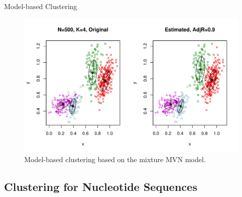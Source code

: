 \documentclass{beamer}
\begin{document}
\begin{frame}{Model-based Clustering}
\vspace{-0.5cm}

\begin{figure}
  \includegraphics[width=\textwidth]{./graph/da4}
  \\
  {\tiny Model-based clustering based on the mixture MVN model.}
\end{figure}

\end{frame}


\subsection{Clustering for Nucleotide Sequences}
\end{document}
